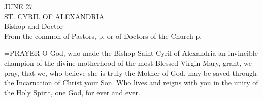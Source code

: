 \begin{center}\normalsize JUNE 27\\
\footnotesize ST. CYRIL OF ALEXANDRIA\\
\footnotesize Bishop and Doctor\\
\footnotesize From the common of Pastors, p.    or of Doctors of the Church p. \\
\end{center}

\hangindent=\parindent \small{PRAYER 
O God, who made the Bishop Saint Cyril of Alexandria
an invincible champion of the divine motherhood
of the most Blessed Virgin Mary,
grant, we pray,
that we, who believe she is truly the Mother of God,
may be saved through the Incarnation of Christ your Son.
Who lives and reigns with you in the unity of the Holy Spirit,
one God, for ever and ever.\\}
 
